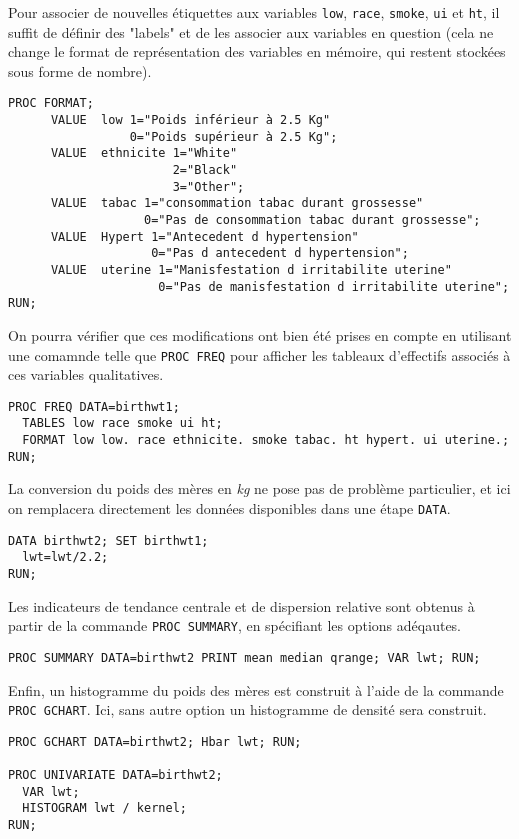 Pour associer de nouvelles étiquettes aux variables \texttt{low},
\texttt{race}, \texttt{smoke}, \texttt{ui} et \texttt{ht}, il suffit de
définir des "labels" et de les associer aux variables en question (cela ne
change le format de représentation des variables en mémoire, qui restent
stockées sous forme de nombre).
\begin{verbatim}
PROC FORMAT;
      VALUE  low 1="Poids inférieur à 2.5 Kg"
                 0="Poids supérieur à 2.5 Kg";
      VALUE  ethnicite 1="White"
                       2="Black"
                       3="Other";
      VALUE  tabac 1="consommation tabac durant grossesse"
                   0="Pas de consommation tabac durant grossesse";
      VALUE  Hypert 1="Antecedent d hypertension"
                    0="Pas d antecedent d hypertension";
      VALUE  uterine 1="Manisfestation d irritabilite uterine"
                     0="Pas de manisfestation d irritabilite uterine";
RUN;
\end{verbatim}
On pourra vérifier que ces modifications ont bien été prises en compte en
utilisant une comamnde telle que \texttt{PROC FREQ} pour afficher les
tableaux d'effectifs associés à ces variables qualitatives.
\begin{verbatim}
PROC FREQ DATA=birthwt1; 
  TABLES low race smoke ui ht;
  FORMAT low low. race ethnicite. smoke tabac. ht hypert. ui uterine.;
RUN;
\end{verbatim}

La conversion du poids des mères en \emph{kg} ne pose pas de problème
particulier, et ici on remplacera directement les données disponibles dans
une étape \texttt{DATA}.
\begin{verbatim}
DATA birthwt2; SET birthwt1;
  lwt=lwt/2.2; 
RUN;
\end{verbatim}

Les indicateurs de tendance centrale et de dispersion relative sont obtenus
à partir de la commande \texttt{PROC SUMMARY}, en spécifiant les options
adéqautes. 
\begin{verbatim}
PROC SUMMARY DATA=birthwt2 PRINT mean median qrange; VAR lwt; RUN;
\end{verbatim}

Enfin, un histogramme du poids des mères est construit à l'aide de la
commande \texttt{PROC GCHART}. Ici, sans autre option un histogramme de
densité sera construit.
\begin{verbatim}
PROC GCHART DATA=birthwt2; Hbar lwt; RUN;

PROC UNIVARIATE DATA=birthwt2;
  VAR lwt;
  HISTOGRAM lwt / kernel;
RUN;
\end{verbatim}


